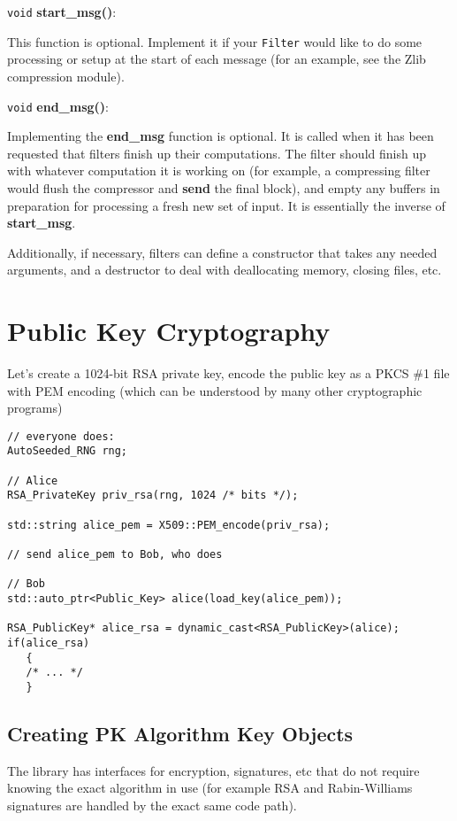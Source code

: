 \documentclass{article}
\newcommand{\function}[1]{\textbf{#1}}
\newcommand{\type}[1]{\texttt{#1}}
\begin{document}
\noindent
\type{void} \function{start\_msg()}:

This function is optional. Implement it if your \type{Filter} would like to do
some processing or setup at the start of each message (for an example, see the
Zlib compression module).

\noindent
\type{void} \function{end\_msg()}:

Implementing the \function{end\_msg} function is optional. It is
called when it has been requested that filters finish up their
computations. The filter should finish up with whatever computation it
is working on (for example, a compressing filter would flush the
compressor and \function{send} the final block), and empty any buffers
in preparation for processing a fresh new set of input. It is
essentially the inverse of \function{start\_msg}.

Additionally, if necessary, filters can define a constructor that
takes any needed arguments, and a destructor to deal with deallocating
memory, closing files, etc.

\pagebreak
\section{Public Key Cryptography}

Let's create a 1024-bit RSA private key, encode the public key as a
PKCS \#1 file with PEM encoding (which can be understood by many other
cryptographic programs)

\begin{verbatim}
// everyone does:
AutoSeeded_RNG rng;

// Alice
RSA_PrivateKey priv_rsa(rng, 1024 /* bits */);

std::string alice_pem = X509::PEM_encode(priv_rsa);

// send alice_pem to Bob, who does

// Bob
std::auto_ptr<Public_Key> alice(load_key(alice_pem));

RSA_PublicKey* alice_rsa = dynamic_cast<RSA_PublicKey>(alice);
if(alice_rsa)
   {
   /* ... */
   }

\end{verbatim}

\subsection{Creating PK Algorithm Key Objects}

The library has interfaces for encryption, signatures, etc that do not require
knowing the exact algorithm in use (for example RSA and Rabin-Williams
signatures are handled by the exact same code path).
\end{document}
